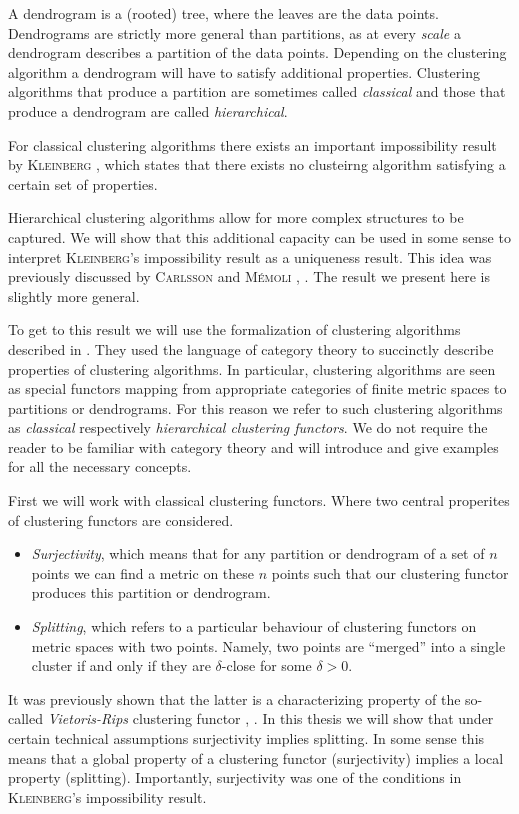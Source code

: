 A dendrogram is a (rooted) tree, where the leaves are the data points. Dendrograms are strictly more general than partitions, as at every \emph{scale} a dendrogram describes a partition of the data points.
Depending on the clustering algorithm a dendrogram will have to satisfy additional properties.
Clustering algorithms that produce a partition are sometimes called \emph{classical} and those that produce a dendrogram are called \emph{hierarchical}.


For classical clustering algorithms there exists an important impossibility result by \textsc{Kleinberg} \cite{Kleinberg2002}, which states that there exists no clusteirng algorithm satisfying a certain set of properties.

Hierarchical clustering algorithms allow for more complex structures to be captured. We will show that this additional capacity can be used in some sense to interpret \textsc{Kleinberg}'s impossibility result as a uniqueness result. This idea was previously discussed by \textsc{Carlsson} and \textsc{M\'emoli} \cite{JMLR:v11:carlsson10a}, \cite{Carlsson2010}. The result we present here is slightly more general.

To get to this result we will use the formalization of clustering algorithms described in \cite{Carlsson2010}. They used the language of category theory to succinctly describe properties of clustering algorithms. In particular, clustering algorithms are seen as special functors mapping from appropriate categories of finite metric spaces to partitions or dendrograms. For this reason we refer to such clustering algorithms as \emph{classical} respectively \emph{hierarchical clustering functors}. We do not require the reader to be familiar with category theory and will introduce and give examples for all the necessary concepts.

First we will work with classical clustering functors. Where two central properites of clustering functors are considered.
\begin{itemize}
    \item \emph{Surjectivity}, which means that for any partition or dendrogram of a set of $n$ points we can find a metric on these $n$ points such that our clustering functor produces this partition or dendrogram.
    \item \emph{Splitting}, which refers to a particular behaviour of clustering functors on metric spaces with two points. Namely, two points are ``merged'' into a single cluster if and only if they are $\delta$-close for some $\delta > 0$.
\end{itemize}
It was previously shown that the latter is a characterizing property of the so-called \emph{Vietoris-Rips} clustering functor \cite{JMLR:v11:carlsson10a}, \cite{Carlsson2010}.
In this thesis we will show that under certain technical assumptions surjectivity implies splitting. In some sense this means that a global property of a clustering functor (surjectivity) implies a local property (splitting). Importantly, surjectivity was one of the conditions in \textsc{Kleinberg}'s impossibility result.

